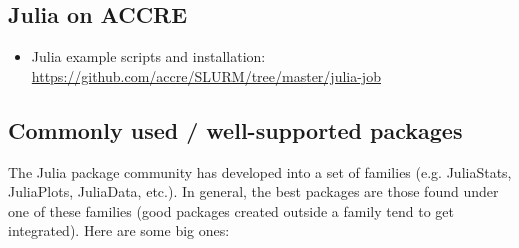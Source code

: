 \documentclass[12pt]{article}
\begin{document}
\subsection*{Julia on ACCRE}
\begin{itemize}
    \item Julia example scripts and installation: \url{https://github.com/accre/SLURM/tree/master/julia-job}
\end{itemize}

\subsection*{Commonly used / well-supported packages}
The Julia package community has developed into a set of families (e.g. JuliaStats, JuliaPlots, JuliaData, etc.). In general, the best packages are those found under one of these families (good packages created outside a family tend to get integrated). Here are some big ones:
\end{document}

